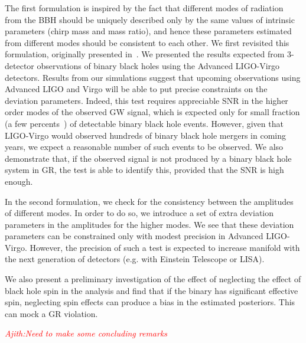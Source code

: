 \documentclass[prd,preprintnumbers,twocolumn,eqsecnum,floatfix,a4paper,nofootinbib,superscriptaddress]{revtex4}
\newcommand{\ajith}[1]{\textcolor{red}{\textit{Ajith:#1}}}
\begin{document}
The first formulation is inspired by the fact that different modes of radiation from the BBH should be uniquely described only by the same values of intrinsic parameters (chirp mass and mass ratio), and hence these parameters estimated from different modes should be consistent to each other. We first revisited this formulation, originally presented in~\cite{dhanpal2018}. We presented the results expected from 3-detector observations of binary black holes using the Advanced LIGO-Virgo detectors. Results from our simulations suggest that upcoming observations using Advanced LIGO and Virgo will be able to put precise constraints on the deviation parameters. Indeed, this test requires appreciable SNR in the higher order modes of the observed GW signal, which is expected only for small fraction (a few percents~\cite{Dhanpal}) of detectable binary black hole events. However, given that LIGO-Virgo would observed hundreds of binary black hole mergers in coming years, we expect a reasonable number of such events to be observed. We also demonstrate that, if the observed signal is not produced by a binary black hole system in GR, the test is able to identify this, provided that the SNR is high enough. 

In the second formulation, we check for the consistency between the amplitudes of different modes. In order to do so, we introduce a set of extra deviation parameters in the amplitudes for the higher modes. We see that these deviation parameters can be constrained only with modest precision in Advanced LIGO-Virgo. However, the precision of such a test is expected to increase manifold with the next generation of detectors (e.g. with Einstein Telescope or LISA). 

We also present a preliminary investigation of the effect of neglecting the effect of black hole spin in the analysis and find that if the binary has significant effective spin, neglecting spin effects can produce a bias in the estimated posteriors. This can mock a GR violation. 

\ajith{Need to make some concluding remarks}


\newpage

\end{document}
